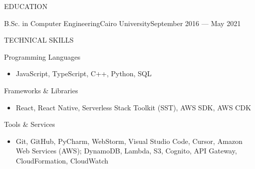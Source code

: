\documentclass[]{mcdowellcv}
\begin{document}
	\begin{cvsection}{EDUCATION}
		\begin{cvsubsection}{B.Sc. in Computer Engineering}{Cairo University}{September 2016 — May 2021}\end{cvsubsection}
	\end{cvsection}
	\vspace*{-12pt}
	
	\begin{cvsection}{TECHNICAL SKILLS}
		\begin{cvsubsection}{Programming Languages}{}{}
			\begin{itemize}
				\item JavaScript, TypeScript, C++, Python, SQL
			\end{itemize}
		\end{cvsubsection}
		\begin{cvsubsection}{Frameworks \& Libraries}{}{}
			\begin{itemize}
				\item React, React Native, Serverless Stack Toolkit (SST), AWS SDK, AWS CDK
			\end{itemize}
		\end{cvsubsection}
		\begin{cvsubsection}{Tools \& Services}{}{}
			\begin{itemize}
				\item Git, GitHub, PyCharm, WebStorm, Visual Studio Code, Cursor, Amazon Web Services (AWS); DynamoDB, Lambda, S3, Cognito, API Gateway, CloudFormation, CloudWatch
			\end{itemize}
		\end{cvsubsection}
	\end{cvsection}
	
\end{document}
